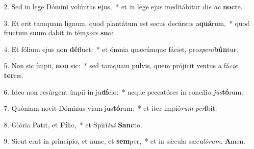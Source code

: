 2. Sed in lege Dómini volúntas \textbf{e}jus,~*  et in lege ejus meditábitur di\textit{e} \textit{ac} \textbf{noc}te.\

3. Et erit tamquam lignum, quod plantátum est secus decúrsus a\textbf{quá}rum,~*  quod fructum suum dabit in tém\textit{po}\textit{re} \textbf{su}o:\

4. Et fólium ejus non \textbf{dé}fluet:~*  et ómnia quæcúmque fáciet, pro\textit{spe}\textit{ra}\textbf{bún}tur.\

5. Non sic ímpii, \textbf{non} sic:~*  sed tamquam pulvis, quem prójicit ventus a fá\textit{ci}\textit{e} \textbf{ter}ræ.\

6. Ideo non resúrgent ímpii in ju\textbf{dí}cio:~*  neque peccatóres in concíli\textit{o} \textit{jus}\textbf{tó}rum.\

7. Quóniam novit Dóminus viam jus\textbf{tó}rum:~*  et iter impió\textit{rum} \textit{per}\textbf{í}bit.\

8. Glória Patri, et \textbf{Fí}lio,~*  et Spirí\textit{tu}\textit{i} \textbf{Sanc}to.\

9. Sicut erat in princípio, et nunc, et \textbf{sem}per,~*  et in sǽcula sæcu\textit{ló}\textit{rum}. \textbf{A}men.\

